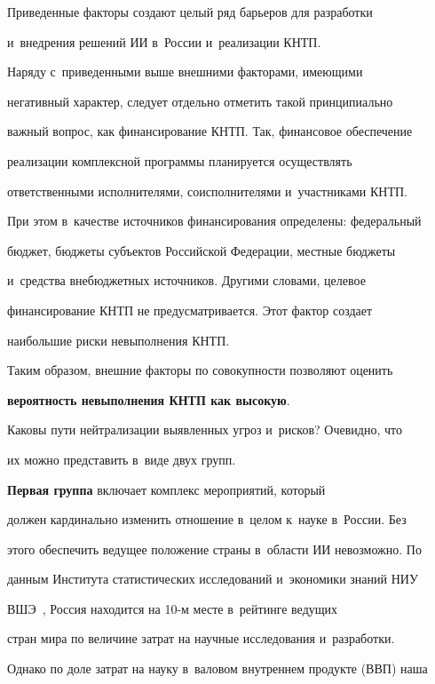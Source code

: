     

    Приведенные факторы создают целый ряд барьеров для разработки 

и~внед\-ре\-ния решений ИИ в~России и~реализации КНТП.

    

    Наряду с~приведенными выше внешними факторами, имеющими 

негативный характер, следует отдельно отметить такой принципиально 

важный вопрос, как финансирование КНТП. Так, финансовое обеспечение 

реализации комплексной программы планируется осуществлять 

ответственными исполнителями, соисполнителями и~участниками КНТП. 

При этом в~качестве источников финансирования определены: федеральный 

бюджет, бюджеты субъектов Российской Федерации, местные бюджеты 

и~средства внебюджетных источников. Другими словами, целевое 

финансирование КНТП не предусматривается. Этот фактор создает 

наибольшие риски невыполнения КНТП. 

    

    Таким образом, внешние факторы по совокупности позволяют оценить 

\textbf{вероятность невыполнения КНТП как высокую}. 

    

    Каковы пути нейтрализации выявленных угроз и~рисков? Очевидно, что 

их можно представить в~виде двух групп. 

    

    \textbf{Первая группа} включает комплекс мероприятий, который 

должен кардинально изменить отношение в~целом к~науке в~России. Без 

этого обеспечить ведущее положение страны в~области ИИ невозможно. По 

данным Института статистических исследований и~экономики знаний НИУ 

ВШЭ~\cite{12-zat}, Россия находится на 10-м месте в~рейтинге ведущих 

стран мира по величине затрат на научные исследования и~разработки. 

Однако по доле затрат на науку в~валовом внутреннем продукте (ВВП) наша 

